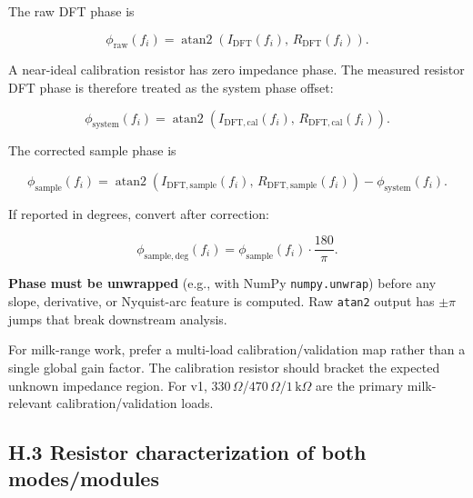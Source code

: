 \documentclass[11pt,a4paper]{article}
\newcommand{\kohm}[1]{\ensuremath{#1\,\mathrm{k}\Omega}}
\newcommand{\Rohm}[1]{\ensuremath{#1\,\Omega}}
\begin{document}
The raw DFT phase is

\begin{equation}
\phi_{\mathrm{raw}}(f_i) = \operatorname{atan2}\!\left( I_{\mathrm{DFT}}(f_i),\, R_{\mathrm{DFT}}(f_i) \right).
\label{eq:raw_phase}
\end{equation}

A near-ideal calibration resistor has zero impedance phase. The measured resistor DFT phase is therefore treated as the system phase offset:

\begin{equation}
\phi_{\mathrm{system}}(f_i) = \operatorname{atan2}\!\left( I_{\mathrm{DFT,cal}}(f_i),\, R_{\mathrm{DFT,cal}}(f_i) \right).
\label{eq:system_phase}
\end{equation}

The corrected sample phase is

\begin{equation}
\phi_{\mathrm{sample}}(f_i) = \operatorname{atan2}\!\left( I_{\mathrm{DFT,sample}}(f_i),\, R_{\mathrm{DFT,sample}}(f_i) \right) - \phi_{\mathrm{system}}(f_i).
\label{eq:corrected_phase}
\end{equation}

If reported in degrees, convert after correction:

\begin{equation}
\phi_{\mathrm{sample,deg}}(f_i) = \phi_{\mathrm{sample}}(f_i)\cdot \frac{180}{\pi}.
\label{eq:phase_deg}
\end{equation}

\begin{rulebox}
\textbf{Phase must be unwrapped} (e.g., with NumPy \texttt{numpy.unwrap}) before any slope, derivative, or Nyquist-arc feature is computed. Raw \texttt{atan2} output has $\pm\pi$ jumps that break downstream analysis.
\end{rulebox}

\begin{openbox}
For milk-range work, prefer a multi-load calibration/validation map rather than a single global gain factor. The calibration resistor should bracket the expected unknown impedance region. For v1, \Rohm{330}/\Rohm{470}/\kohm{1} are the primary milk-relevant calibration/validation loads.
\end{openbox}

\subsection{H.3 Resistor characterization of both modes/modules}
\end{document}

